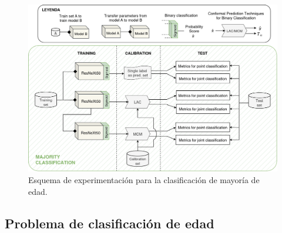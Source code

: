 \begin{figure}[htbp]
    \centering
    \includegraphics[angle=90, width=\textwidth]{capitulos/cap_05/imagenes/AMM_experimental_pipeline.png}
    \caption[
        Esquema de experimentación para la clasificación de mayoría de edad.
    ]{
        Esquema de experimentación para la clasificación de mayoría de edad. 
    } 
    \label{fig:AMM_experimental_pipeline}
\end{figure}

\FloatBarrier


\subsection{Problema de clasificación de edad}




